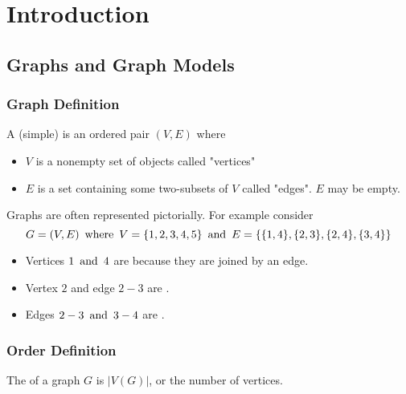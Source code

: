 \section{Introduction}

\subsection{Graphs and Graph Models}

\subsubsection*{Graph Definition}
A (simple)  is an ordered pair $(V,E)$ where
\begin{itemize}
    \item $V$ is a nonempty set of objects called "vertices"
    \item $E$ is a set containing some two-subsets of $V$ called "edges". $E$ may be empty.
\end{itemize}

Graphs are often represented pictorially. For example consider
\[
    G = (V,E) \operatorname{~\text{where}~} V = \{1,2,3,4,5\} \operatorname{~\text{and}~} E = \{\{1,4\},\{2,3\},\{2,4\},\{3,4\}\}
\]

\begin{center}
\end{center}
\begin{itemize}
    \item Vertices $1 \operatorname{~\text{and}~} 4$ are  because they are joined by an edge.
    \item Vertex $2$ and edge $2-3$ are .
    \item Edges $2-3 \operatorname{~\text{and}~} 3-4$ are .
\end{itemize}

\subsubsection*{Order Definition}
The  of a graph $G$ is $|V(G)|$, or the number of vertices.

